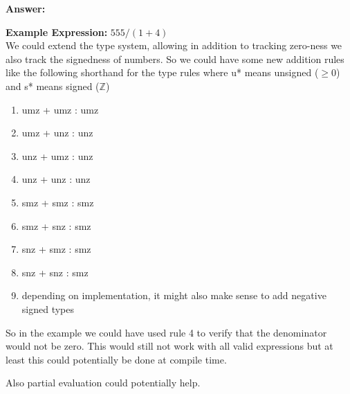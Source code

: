 \documentclass{article}
\begin{document}
\textbf{Answer:}

\textbf{Example Expression:} $555 / (1 + 4)$ \\
We could extend the type system, allowing in addition to tracking zero-ness we also track the signedness of numbers. So we could have some new addition rules like the following shorthand for the type rules where u* means unsigned ($\ge 0$) and s* means signed ($\mathbb{Z}$)

\begin{enumerate}
    \item umz + umz : umz
    \item umz + unz : unz
    \item unz + umz : unz
    \item unz + unz : unz\\

    \item smz + smz : smz
    \item smz + snz : smz
    \item snz + smz : smz
    \item snz + snz : smz\\

    \item depending on implementation, it might also make sense to add negative signed types
\end{enumerate}

So in the example we could have used rule 4 to verify that the denominator would not be zero. This would still not work with all valid expressions but at least this could potentially be done at compile time.

Also partial evaluation could potentially help.
\end{document}
